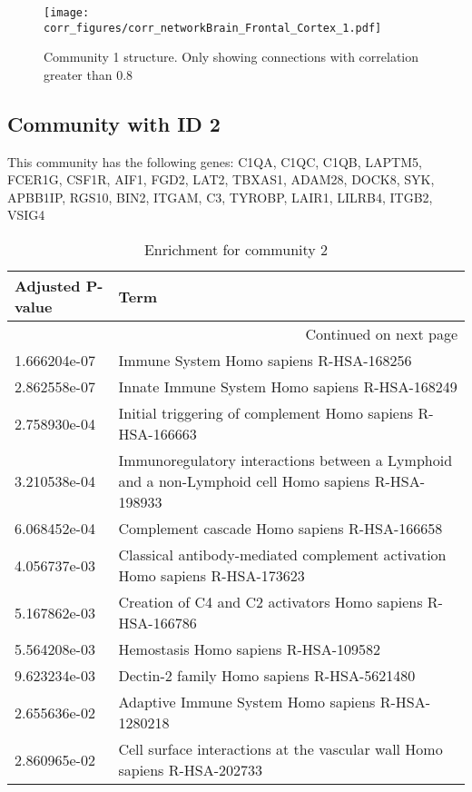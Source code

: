 \begin{figure}[h!]
\centering
\texttt{[image: corr\_figures/corr\_networkBrain\_Frontal\_Cortex\_1.pdf]}
\caption{Community 1 structure. Only showing connections with correlation greater than 0.8}
\end{figure}




\subsection*{Community with ID 2}
This community has the following genes: C1QA, C1QC, C1QB, LAPTM5, FCER1G, CSF1R, AIF1, FGD2, LAT2, TBXAS1, ADAM28, DOCK8, SYK, APBB1IP, RGS10, BIN2, ITGAM, C3, TYROBP, LAIR1, LILRB4, ITGB2, VSIG4
\\
\begin{longtable}{p{2.4cm}p{14.5cm}}
\caption{Enrichment for community 2}\\
\toprule
Adjusted \newline P-value &                                                                                                Term \\
\midrule
\endhead
\midrule
\multicolumn{2}{r}{{Continued on next page}} \\
\midrule
\endfoot

\bottomrule
\endlastfoot
             1.666204e-07 &                                                             Immune System Homo sapiens R-HSA-168256 \\
             2.862558e-07 &                                                      Innate Immune System Homo sapiens R-HSA-168249 \\
             2.758930e-04 &                                          Initial triggering of complement Homo sapiens R-HSA-166663 \\
             3.210538e-04 &  Immunoregulatory interactions between a Lymphoid and a non-Lymphoid cell Homo sapiens R-HSA-198933 \\
             6.068452e-04 &                                                        Complement cascade Homo sapiens R-HSA-166658 \\
             4.056737e-03 &                         Classical antibody-mediated complement activation Homo sapiens R-HSA-173623 \\
             5.167862e-03 &                                          Creation of C4 and C2 activators Homo sapiens R-HSA-166786 \\
             5.564208e-03 &                                                                Hemostasis Homo sapiens R-HSA-109582 \\
             9.623234e-03 &                                                          Dectin-2 family Homo sapiens R-HSA-5621480 \\
             2.655636e-02 &                                                   Adaptive Immune System Homo sapiens R-HSA-1280218 \\
             2.860965e-02 &                            Cell surface interactions at the vascular wall Homo sapiens R-HSA-202733 \\
\end{longtable}



